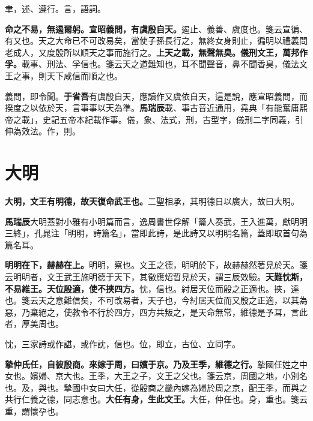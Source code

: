 \begin{quoting}聿，述、遵行。言，語詞。\end{quoting}

\textbf{命之不易，無遏爾躬。宣昭義問，有虞殷自天。}{\footnotesize 遏止、義善、虞度也。箋云宣徧、有又也。天之大命已不可改易矣，當使子孫長行之，無終女身則止，徧明以禮義問老成人，又度殷所以順天之事而施行之。}\textbf{上天之載，無聲無臭。儀刑文王，萬邦作孚。}{\footnotesize 載事、刑法、孚信也。箋云天之道難知也，耳不聞聲音，鼻不聞香臭，儀法文王之事，則天下咸信而順之也。}

\begin{quoting}義問，即令聞。\textbf{于省吾}有虞殷自天，應讀作又虞依自天，這是說，應宣昭義問，而揆度之以依於天，言事事以天為準。\textbf{馬瑞辰}載、事古音近通用，堯典「有能奮庸熙帝之載」，史記五帝本紀載作事。儀，象、法式，刑，古型字，儀刑二字同義，引伸為效法。作，則。\end{quoting}

\section{大明}


\textbf{大明，文王有明德，故天復命武王也。}{\footnotesize 二聖相承，其明德日以廣大，故曰大明。}

\begin{quoting}\textbf{馬瑞辰}大明蓋對小雅有小明篇而言，逸周書世俘解「籥人奏武，王入進萬，獻明明三終」，孔晁注「明明，詩篇名」，當即此詩，是此詩又以明明名篇，蓋即取首句為篇名耳。\end{quoting}

\textbf{明明在下，赫赫在上。}{\footnotesize 明明，察也。文王之德，明明於下，故赫赫然著見於天。箋云明明者，文王武王施明德于天下，其徵應炤晢見於天，謂三辰效驗。}\textbf{天難忱斯，不易維王。天位殷適，使不挾四方。}{\footnotesize 忱，信也。紂居天位而殷之正適也。挾，達也。箋云天之意難信矣，不可改易者，天子也，今紂居天位而又殷之正適，以其為惡，乃棄絕之，使教令不行於四方，四方共叛之，是天命無常，維德是予耳，言此者，厚美周也。}

\begin{quoting}忱，三家詩或作諶，或作訦，信也。位，即立，古位、立同字。\end{quoting}

\textbf{摯仲氏任，自彼殷商。來嫁于周，曰嬪于京。乃及王季，維德之行。}{\footnotesize 摯國任姓之中女也。嬪婦、京大也。王季，大王之子，文王之父也。箋云京，周國之地，小別名也。及，與也。摯國中女曰大任，從殷商之畿內嫁為婦於周之京，配王季，而與之共行仁義之德，同志意也。}\textbf{大任有身，生此文王。}{\footnotesize 大任，仲任也。身，重也。箋云重，謂懷孕也。}

